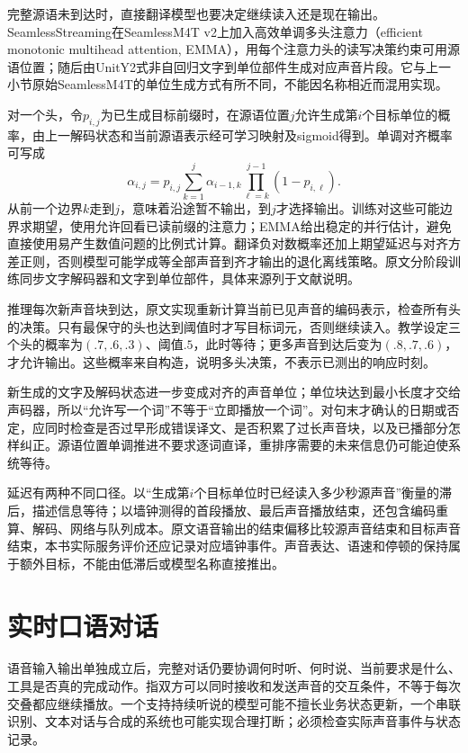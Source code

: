 完整源语未到达时，直接翻译模型也要决定继续读入还是现在输出。SeamlessStreaming在SeamlessM4T v2上加入高效单调多头注意力（efficient monotonic multihead attention, EMMA），用每个注意力头的读写决策约束可用源语位置；随后由UnitY2式非自回归文字到单位部件生成对应声音片段。它与上一小节原始SeamlessM4T的单位生成方式有所不同，不能因名称相近而混用实现。

对一个头，令$p_{i,j}$为已生成目标前缀时，在源语位置$j$允许生成第$i$个目标单位的概率，由上一解码状态和当前源语表示经可学习映射及sigmoid得到。单调对齐概率可写成
\begin{equation}
 \alpha_{i,j}=p_{i,j}
      \sum_{k=1}^{j}\alpha_{i-1,k}
         \prod_{\ell=k}^{j-1}(1-p_{i,\ell}).
 \label{eq:nlp-speech-emma}
\end{equation}
从前一个边界$k$走到$j$，意味着沿途暂不输出，到$j$才选择输出。训练对这些可能边界求期望，使用允许回看已读前缀的注意力；EMMA给出稳定的并行估计，避免直接使用易产生数值问题的比例式计算。翻译负对数概率还加上期望延迟与对齐方差正则，否则模型可能学成等全部声音到齐才输出的退化离线策略。原文分阶段训练同步文字解码器和文字到单位部件，具体来源列于文献说明。

推理每次新声音块到达，原文实现重新计算当前已见声音的编码表示，检查所有头的决策。只有最保守的头也达到阈值时才写目标词元，否则继续读入。教学设定三个头的概率为$(.7,.6,.3)$、阈值$.5$，此时等待；更多声音到达后变为$(.8,.7,.6)$，才允许输出。这些概率来自构造，说明多头决策，不表示已测出的响应时刻。

新生成的文字及解码状态进一步变成对齐的声音单位；单位块达到最小长度才交给声码器，所以“允许写一个词”不等于“立即播放一个词”。对句末才确认的日期或否定，应同时检查是否过早形成错误译文、是否积累了过长声音块，以及已播部分怎样纠正。源语位置单调推进不要求逐词直译，重排序需要的未来信息仍可能迫使系统等待。

延迟有两种不同口径。以“生成第$i$个目标单位时已经读入多少秒源声音”衡量的滞后，描述信息等待；以墙钟测得的首段播放、最后声音播放结束，还包含编码重算、解码、网络与队列成本。原文语音输出的结束偏移比较源声音结束和目标声音结束，本书实际服务评价还应记录对应墙钟事件。声音表达、语速和停顿的保持属于额外目标，不能由低滞后或模型名称直接推出。

\section{实时口语对话}
\label{sec:nlp-speech-realtime-dialogue}

语音输入输出单独成立后，完整对话仍要协调何时听、何时说、当前要求是什么、工具是否真的完成动作。指双方可以同时接收和发送声音的交互条件，不等于每次交叠都应继续播放。一个支持持续听说的模型可能不擅长业务状态更新，一个串联识别、文本对话与合成的系统也可能实现合理打断；必须检查实际声音事件与状态记录。

